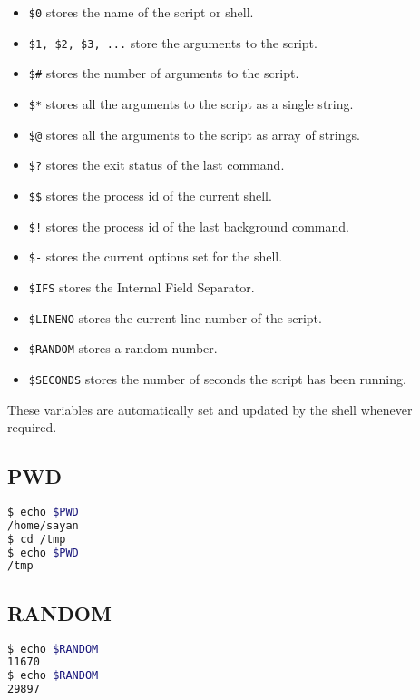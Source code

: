 \begin{itemize}
  \item \lstinline{$0} stores the name of the script or shell.
  \item \lstinline{$1, $2, $3, ...} store the arguments to the script.
  \item \lstinline{$#} stores the number of arguments to the script.
  \item \lstinline{$*} stores all the arguments to the script as a single string.
  \item \lstinline{$@} stores all the arguments to the script as array of strings.
  \item \lstinline{$?} stores the exit status of the last command.
  \item \lstinline{$$} stores the process id of the current shell.
  \item \lstinline{$!} stores the process id of the last background command.
  \item \lstinline{$-} stores the current options set for the shell.
  \item \lstinline{$IFS} stores the Internal Field Separator.
  \item \lstinline{$LINENO} stores the current line number of the script.
  \item \lstinline{$RANDOM} stores a random number.
  \item \lstinline{$SECONDS} stores the number of seconds the script has been running.
\end{itemize}


These variables are automatically set and updated by the shell whenever required.

\subsection{PWD}

\begin{lstlisting}[language=bash]
$ echo $PWD
/home/sayan
$ cd /tmp
$ echo $PWD
/tmp
\end{lstlisting}

\subsection{RANDOM}

\begin{lstlisting}[language=bash]
$ echo $RANDOM
11670
$ echo $RANDOM
29897
\end{lstlisting}

